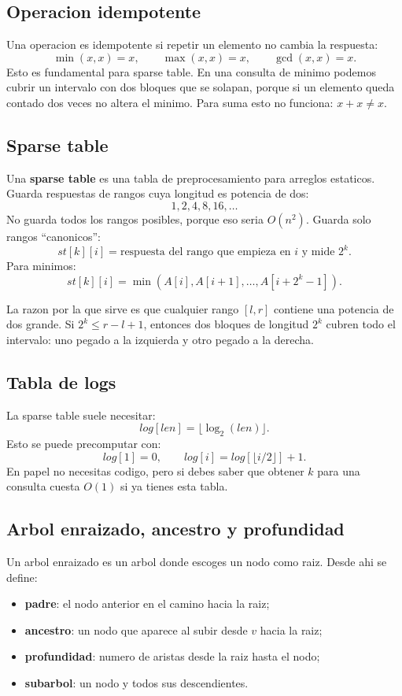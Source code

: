\documentclass[10pt]{article}
\newcommand{\bigO}{O}
\begin{document}
\subsection{Operacion idempotente}
Una operacion es idempotente si repetir un elemento no cambia la respuesta:
\[
\min(x,x)=x,\qquad \max(x,x)=x,\qquad \gcd(x,x)=x.
\]
Esto es fundamental para sparse table. En una consulta de minimo podemos cubrir
un intervalo con dos bloques que se solapan, porque si un elemento queda contado
dos veces no altera el minimo. Para suma esto no funciona: $x+x\ne x$.

\subsection{Sparse table}
Una \textbf{sparse table} es una tabla de preprocesamiento para arreglos
estaticos. Guarda respuestas de rangos cuya longitud es potencia de dos:
\[
1,2,4,8,16,\ldots
\]
No guarda todos los rangos posibles, porque eso seria $\bigO(n^2)$. Guarda solo
rangos ``canonicos'':
\[
st[k][i] = \text{respuesta del rango que empieza en }i\text{ y mide }2^k.
\]
Para minimos:
\[
st[k][i]=\min(A[i],A[i+1],\ldots,A[i+2^k-1]).
\]

La razon por la que sirve es que cualquier rango $[l,r]$ contiene una potencia
de dos grande. Si $2^k\le r-l+1$, entonces dos bloques de longitud $2^k$ cubren
todo el intervalo: uno pegado a la izquierda y otro pegado a la derecha.

\subsection{Tabla de logs}
La sparse table suele necesitar:
\[
log[len]=\lfloor \log_2(len)\rfloor.
\]
Esto se puede precomputar con:
\[
log[1]=0,\qquad log[i]=log[\lfloor i/2\rfloor]+1.
\]
En papel no necesitas codigo, pero si debes saber que obtener $k$ para una
consulta cuesta $\bigO(1)$ si ya tienes esta tabla.

\subsection{Arbol enraizado, ancestro y profundidad}
Un arbol enraizado es un arbol donde escoges un nodo como raiz. Desde ahi se
define:
\begin{itemize}[leftmargin=*]
\item \textbf{padre}: el nodo anterior en el camino hacia la raiz;
\item \textbf{ancestro}: un nodo que aparece al subir desde $v$ hacia la raiz;
\item \textbf{profundidad}: numero de aristas desde la raiz hasta el nodo;
\item \textbf{subarbol}: un nodo y todos sus descendientes.
\end{itemize}
\end{document}
